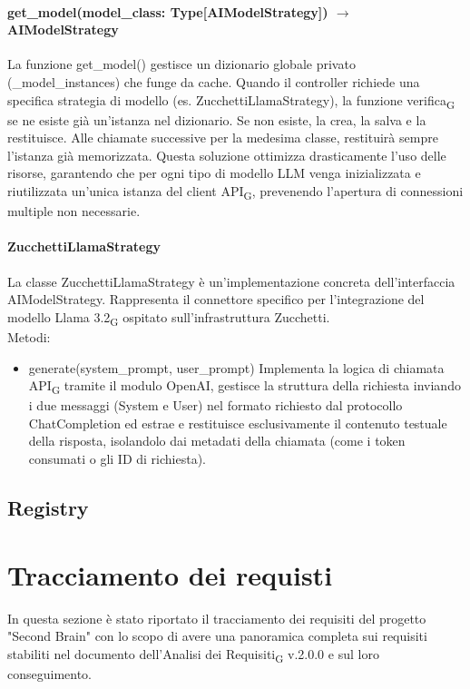 \documentclass[11pt,a4paper]{article}
\newcommand{\gls}[1]{#1\textsubscript{G}}
\begin{document}
\paragraph{get\_model(model\_class: Type[AIModelStrategy]) $\rightarrow$ AIModelStrategy} La funzione get\_model() gestisce un dizionario globale privato (\_model\_instances) che funge da cache.
Quando il controller richiede una specifica strategia di modello (es. ZucchettiLlamaStrategy), la funzione \gls{verifica} se ne esiste già un'istanza nel dizionario. Se non esiste, la crea, la salva e la restituisce. Alle chiamate successive per la medesima classe, restituirà sempre l'istanza già memorizzata.
Questa soluzione ottimizza drasticamente l'uso delle risorse, garantendo che per ogni tipo di modello LLM venga inizializzata e riutilizzata un'unica istanza del client \gls{API}, prevenendo l'apertura di connessioni multiple non necessarie.

\paragraph{ZucchettiLlamaStrategy} La classe ZucchettiLlamaStrategy è un'implementazione concreta dell'interfaccia AIModelStrategy. Rappresenta il connettore specifico per l'integrazione del modello \gls{Llama 3.2} ospitato sull'infrastruttura Zucchetti.
\\ Metodi:
\begin{itemize}
    \item generate(system\_prompt, user\_prompt) Implementa la logica di chiamata \gls{API} tramite il modulo OpenAI, gestisce la struttura della richiesta inviando i due messaggi (System e User) nel formato richiesto dal protocollo ChatCompletion ed estrae e restituisce esclusivamente il contenuto testuale della risposta, isolandolo dai metadati della chiamata (come i token consumati o gli ID di richiesta).
\end{itemize}

\subsection{Registry}








\section{Tracciamento dei requisti}
In questa sezione è stato riportato il tracciamento dei requisiti del progetto "Second Brain" con lo scopo di avere una panoramica completa sui requisiti stabiliti nel documento dell'\gls{Analisi dei Requisiti} v.2.0.0 e sul loro conseguimento.
\end{document}
